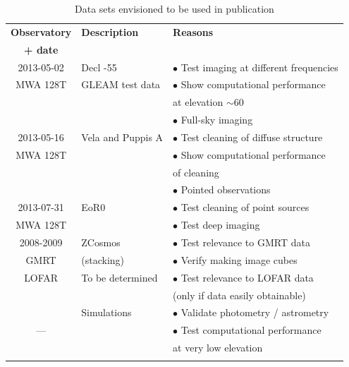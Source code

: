\documentclass[a4paper,10pt]{article}
\begin{document}
\begin{table}
\caption{Data sets envisioned to be used in publication} \label{tbl:observations}
 \begin{tabular}{|c|l|p{6cm}|}
 \hhline{|=|=|=|}
 \textbf{Observatory} & \textbf{Description} & \textbf{Reasons} \\
 \textbf{+ date} & & \\
 \hhline{|=|=|=|}
  2013-05-02 & Decl -55          & $\bullet$ Test imaging at different frequencies\\
  MWA 128T   & GLEAM test data   & $\bullet$ Show computational performance \\
             &                   & \hspace{5mm} at elevation $\sim 60$\\
             &                   & $\bullet$ Full-sky imaging \\
 \hline
  2013-05-16 & Vela and Puppis A & $\bullet$ Test cleaning of diffuse structure \\
  MWA 128T   &                   & $\bullet$ Show computational performance \\
             &                   & \hspace{5mm} of cleaning\\
             &                   & $\bullet$ Pointed observations \\
 \hline
  2013-07-31 & EoR0              & $\bullet$ Test cleaning of point sources \\
  MWA 128T   &                   & $\bullet$ Test deep imaging \\
 \hline
  2008-2009  & ZCosmos           & $\bullet$ Test relevance to GMRT data \\
  GMRT       & (stacking)        & $\bullet$ Verify making image cubes \\
 \hline
  LOFAR      & To be determined  & $\bullet$ Test relevance to LOFAR data \\
             &                   & (only if data easily obtainable) \\
 \hline
             & Simulations       & $\bullet$ Validate photometry / astrometry \\
   ---       &                   & $\bullet$ Test computational performance \\
             &                   & \hspace{5mm} at very low elevation\\
 \hhline{|=|=|=|}
\end{tabular}
\end{table}

\label{lastpage}



\end{document}
